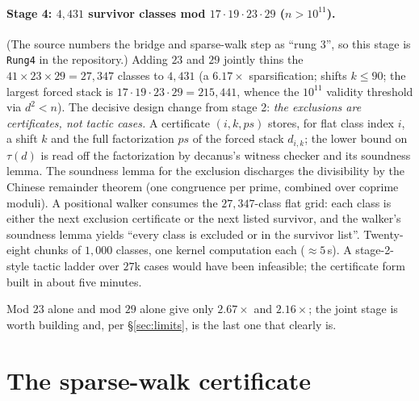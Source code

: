 \documentclass[11pt]{article}
\begin{document}
\paragraph{Stage 4: $4{,}431$ survivor classes mod $17\cdot19\cdot23\cdot29$ ($n>10^{11}$).}\label{sec:rung4}
(The source numbers the bridge and sparse-walk step as ``rung 3'', so this stage is \texttt{Rung4} in the repository.) Adding $23$ and $29$ jointly thins the $41\times23\times29=27{,}347$ classes to $4{,}431$ (a $6.17\times$ sparsification; shifts $k\le90$; the largest forced stack is $17\cdot19\cdot23\cdot29=215{,}441$, whence the $10^{11}$ validity threshold via $d^{2}<n$). The decisive design change from stage 2: \emph{the exclusions are certificates, not tactic cases.} A certificate $(i,k,ps)$ stores, for flat class index $i$, a shift $k$ and the full factorization $ps$ of the forced stack $d_{i,k}$; the lower bound on $\tau(d)$ is read off the factorization by decanus's witness checker and its soundness lemma. The soundness lemma for the exclusion discharges the divisibility by the Chinese remainder theorem (one congruence per prime, combined over coprime moduli). A positional walker consumes the $27{,}347$-class flat grid: each class is either the next exclusion certificate or the next listed survivor, and the walker's soundness lemma yields ``every class is excluded or in the survivor list''. Twenty-eight chunks of $1{,}000$ classes, one kernel computation each ($\approx5$\,s). A stage-2-style tactic ladder over $27$k cases would have been infeasible; the certificate form built in about five minutes.

Mod $23$ alone and mod $29$ alone give only $2.67\times$ and $2.16\times$; the joint stage is worth building and, per \S\ref{sec:limits}, is the last one that clearly is.

\section{The sparse-walk certificate}\label{sec:walk}
\end{document}
